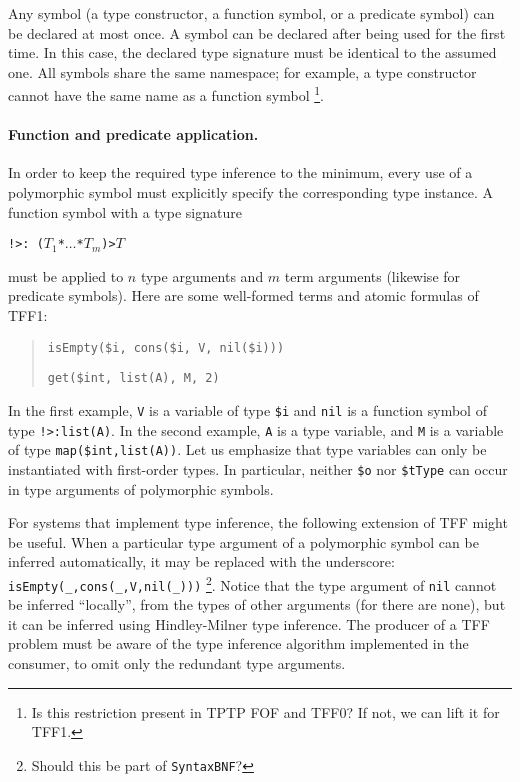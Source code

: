 Any symbol (a type constructor, a function symbol, or a predicate symbol)
can be declared at most once. A symbol can be declared after being used
for the first time. In this case, the declared type signature must be
identical to the assumed one. All symbols share the same namespace; for
example, a type constructor cannot have the same name as a function symbol%
\footnote{Is this restriction present in TPTP FOF and TFF0? If not, we can
lift it for TFF1.}.

\paragraph{Function and predicate application.} In order to keep
the required type inference to the minimum, every use of a polymorphic
symbol must explicitly specify the corresponding type instance.
A function symbol with a type signature
\begin{center}
{\tt !>\;:\;%
($T_1$\;*\;${\dots}$\;*\;$T_m$)\;>\;$T$}
\end{center}
must be applied to $n$ type arguments and $m$ term arguments
(likewise for predicate symbols). Here are some well-formed
terms and atomic formulas of TFF1:
\begin{quote}
\verb+isEmpty($i, cons($i, V, nil($i)))+
\par\medskip
\verb+get($int, list(A), M, 2)+
\end{quote}
In the first example, {\tt V} is a variable of type {\tt \$i}
and {\tt nil} is a function
symbol of type {\tt !>\;[A:\$tType]\;:\;list(A)}. In the second
example, {\tt A} is a type variable, and {\tt M} is a variable
of type {\tt map(\$int,list(A))}. Let us emphasize that type
variables can only be instantiated with first-order types.
In particular, neither \verb+$o+ nor \verb+$tType+ can occur
in type arguments of polymorphic symbols.

For systems that implement type inference, the following extension
of TFF might be useful. When a particular type argument of
a polymorphic symbol can be inferred automatically, it may be
replaced with the underscore: \verb+isEmpty(_,cons(_,V,nil(_)))+%
\footnote{Should this be part of {\tt SyntaxBNF}?}.
Notice that the type argument of {\tt nil} cannot be inferred
``locally'', from the types of other arguments (for there are none),
but it can be inferred using Hindley-Milner type inference.
The producer of a TFF problem must be aware of the type
inference algorithm implemented in the consumer, to omit
only the redundant type arguments.

